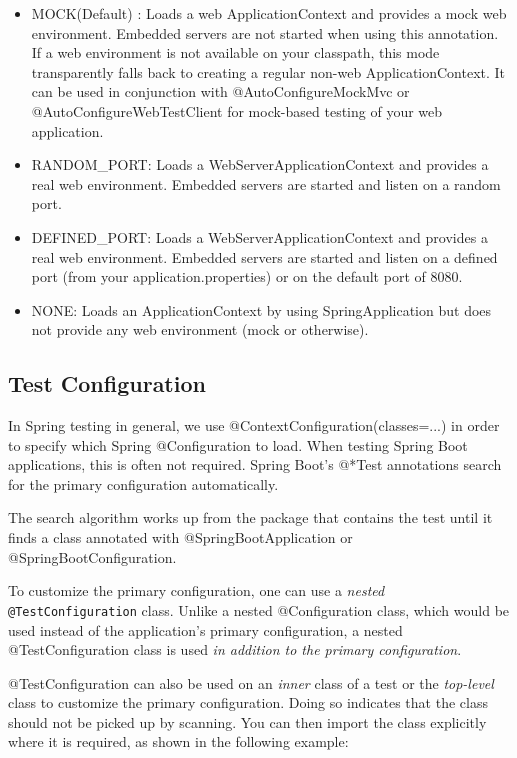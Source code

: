 \documentclass{scrartcl}
\begin{document}
\begin{itemize}
    \item MOCK(Default) : Loads a web ApplicationContext and provides a mock web environment. Embedded servers are not started when using this annotation. If a web environment is not available on your classpath, this mode transparently falls back to creating a regular non-web ApplicationContext. It can be used in conjunction with @AutoConfigureMockMvc or @AutoConfigureWebTestClient for mock-based testing of your web application.

    \item RANDOM\_PORT: Loads a WebServerApplicationContext and provides a real web environment. Embedded servers are started and listen on a random port.

    \item DEFINED\_PORT: Loads a WebServerApplicationContext and provides a real web environment. Embedded servers are started and listen on a defined port (from your application.properties) or on the default port of 8080.

    \item NONE: Loads an ApplicationContext by using SpringApplication but does not provide any web environment (mock or otherwise).
\end{itemize}

\subsection{Test Configuration}

In Spring testing in general, we use @ContextConfiguration(classes=...) in order to specify which Spring @Configuration to load.
When testing Spring Boot applications, this is often not required. Spring Boot’s @*Test annotations search for the primary configuration automatically.

The search algorithm works up from the package that contains the test until it finds a class annotated with @SpringBootApplication or @SpringBootConfiguration.

To customize the primary configuration, one can use a \textit{nested} \lstinline|@TestConfiguration| class. Unlike a nested @Configuration class, which would be used instead of the application’s primary configuration, a nested @TestConfiguration class is used \textit{in addition to the primary configuration}.

@TestConfiguration can also be used on an \textit{inner} class of a test or the \textit{top-level} class to customize the primary configuration. Doing so indicates that the class should not be picked up by scanning. You can then import the class explicitly where it is required, as shown in the following example:
\end{document}
